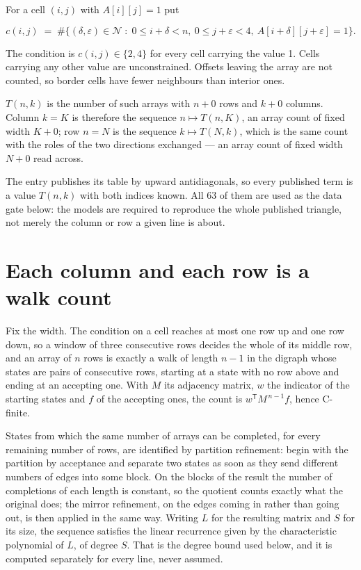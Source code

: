 \documentclass[11pt]{article}
\theoremstyle{definition}
\begin{document}
For a cell $(i,j)$ with $A[i][j] = 1$ put

\[c(i,j) \;=\; \#\bigl\{(\delta,\varepsilon)\in\mathcal{N} \;:\; 0\le i+\delta<n,\ 0\le j+\varepsilon<4,\ A[i+\delta][j+\varepsilon] = 1\bigr\}.\]

The condition is $c(i,j) \in \{2, 4\}$ for every cell carrying the value 1. Cells carrying any other value are unconstrained. Offsets leaving the array are not counted, so border cells have fewer neighbours than interior ones.

$T(n,k)$ is the number of such arrays with $n + 0$ rows and $k + 0$ columns. Column $k = K$ is therefore the sequence $n \mapsto T(n,K)$, an array count of fixed width $K + 0$; row $n = N$ is the sequence $k \mapsto T(N,k)$, which is the same count with the roles of the two directions exchanged --- an array count of fixed width $N + 0$ read across.

The entry publishes its table by upward antidiagonals, so every published term is a value $T(n,k)$ with both indices known. All 63 of them are used as the data gate below: the models are required to reproduce the whole published triangle, not merely the column or row a given line is about.

\section{Each column and each row is a walk count}

Fix the width. The condition on a cell reaches at most one row up and one row down, so a window of three consecutive rows decides the whole of its middle row, and an array of $n$ rows is exactly a walk of length $n-1$ in the digraph whose states are pairs of consecutive rows, starting at a state with no row above and ending at an accepting one. With $M$ its adjacency matrix, $w$ the indicator of the starting states and $f$ of the accepting ones, the count is $w^{\mathsf T}M^{\,n-1}f$, hence C-finite.

States from which the same number of arrays can be completed, for every remaining number of rows, are identified by partition refinement: begin with the partition by acceptance and separate two states as soon as they send different numbers of edges into some block. On the blocks of the result the number of completions of each length is constant, so the quotient counts exactly what the original does; the mirror refinement, on the edges coming in rather than going out, is then applied in the same way. Writing $L$ for the resulting matrix and $S$ for its size, the sequence satisfies the linear recurrence given by the characteristic polynomial of $L$, of degree $S$. That is the degree bound used below, and it is computed separately for every line, never assumed.
\end{document}
